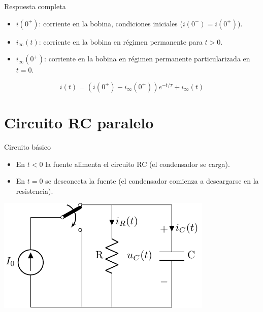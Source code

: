 \documentclass[aspectratio=169, usenames,svgnames,dvipsnames]{beamer}
\begin{document}
\begin{frame}[label={sec:org85d9bb1}]{Respuesta completa}
\begin{itemize}
\item \(i(0^+)\): corriente en la bobina, condiciones iniciales (\(i(0^-) = i(0^+)\)).
\item \(i_\infty(t)\): corriente en la bobina en régimen permanente para \(t > 0\).
\item \(i_\infty(0^+)\): corriente en la bobina en régimen permanente particularizada en \(t = 0\).
\end{itemize}

\[
i(t) = \left(i(0^+) - i_\infty(0^+)\right) e^{-t/\tau} + i_\infty(t)
\]
\end{frame}

\section{Circuito RC paralelo}
\label{sec:org1327bd9}

\begin{frame}[label={sec:org69ae253}]{Circuito básico}
\begin{itemize}
\item En \(t <0\) la fuente alimenta el circuito RC (el condensador se carga).
\item En \(t = 0\) se desconecta la fuente (el condensador comienza a descargarse en la resistencia).
\end{itemize}
\begin{center}
\includegraphics[height=0.5\textheight]{../figs/transitorio_circuitoRC.pdf}
\end{center}
\end{frame}
\end{document}
